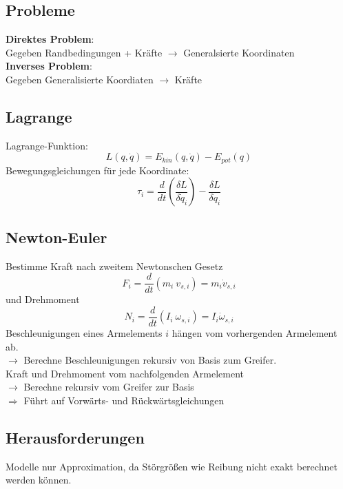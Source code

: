 \subsection{Probleme}
\textbf{Direktes Problem}:\\
Gegeben Randbedingungen + Kräfte \(\rightarrow\) Generalsierte Koordinaten\\

\textbf{Inverses Problem}:\\
Gegeben Generalisierte Koordiaten \(\rightarrow\) Kräfte

\subsection{Lagrange}
Lagrange-Funktion:
\[ L(q, \dot{q}) = E_{\mathit{kin}}(q, \dot{q}) - E_{\mathit{pot}}(q) \]
Bewegungsgleichungen für jede Koordinate:
\[\tau_i = \frac{d}{dt} \left(\frac{\delta L}{\delta \dot{q}_i}\right) - \frac{\delta L}{\delta q_i}\]

\subsection{Newton-Euler}
Bestimme Kraft nach zweitem Newtonschen Gesetz
\[F_i = \frac{d}{dt} (m_i\ v_{s,i}) = m_i \dot{v}_{s,i}\]
und Drehmoment
\[N_i = \frac{d}{dt}(I_i\ \omega_{s,i}) = I_i \dot{\omega}_{s, i}\]
Beschleunigungen eines Armelements \(i\) hängen vom vorhergenden Armelement ab.\\
\(\rightarrow\) Berechne Beschleunigungen rekursiv von Basis zum Greifer.\\
Kraft und Drehmoment vom nachfolgenden Armelement\\
\(\rightarrow\) Berechne rekursiv vom Greifer zur Basis\\

\(\Rightarrow\) Führt auf Vorwärts- und Rückwärtsgleichungen


\subsection{Herausforderungen}
Modelle nur Approximation, da Störgrößen wie Reibung nicht exakt berechnet werden können.
